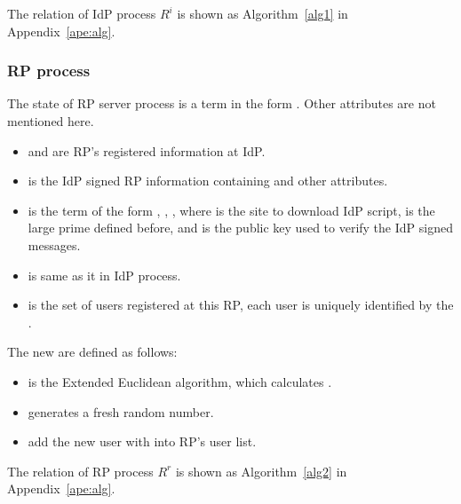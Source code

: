 The relation of IdP process $R^i$ is shown as Algorithm~\ref{alg1} in Appendix~\ref{ape:alg}.





\subsubsection{RP process}
The state of RP server process is a term in the form . Other attributes are not mentioned here.
\begin{itemize}
\setlength\itemsep{-2pt}
\item {} and  are RP's registered information at IdP.
\item {} is the IdP signed RP information containing  and other attributes.
\item {} is the term of the form , , , where  is the site to download IdP script,  is the large prime defined before, and  is the public key used to verify the IdP signed messages.
\item {} is same as it in IdP process.
\item {} is the set of users registered at this RP, each user is uniquely identified by the .
\end{itemize}

The new  are defined as follows:
\begin{itemize}
\setlength\itemsep{-2pt}
 \item {} is the Extended Euclidean algorithm, which calculates  .
  \item {} generates a fresh random number.
  \item {} add the new user with  into RP's user list.
\end{itemize}
The relation of RP process $R^r$ is shown as Algorithm~\ref{alg2} in Appendix~\ref{ape:alg}.




